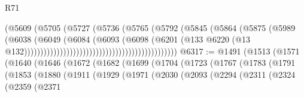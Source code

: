 \begin{lexlean}{R71}
\begin{coremodule}
                                                              (@5609
                                                                (@5705
                                                                  (@5727
                                                                    (@5736
                                                                      (@5765
                                                                        (@5792
                                                                          (@5845
                                                                            (@5864
                                                                              (@5875
                                                                                (@5989
                                                                                  (@6038
                                                                                    (@6049
                                                                                      (@6084
                                                                                        (@6093
                                                                                          (@6098
                                                                                            (@6201
                                                                                              (@133
                                                                                                @6220
                                                                                                (@13
                                                                                                  @132)))))))))))))))))))))))))))))))))))))))))))))))
@6317 := @1491
    (@1513
      (@1571
        (@1640
          (@1646
            (@1672
              (@1682
                (@1699
                  (@1704
                    (@1723
                      (@1767
                        (@1783
                          (@1791
                            (@1853
                              (@1880
                                (@1911
                                  (@1929
                                    (@1971
                                      (@2030
                                        (@2093
                                          (@2294
                                            (@2311
                                              (@2324
                                                (@2359
                                                  (@2371

\end{coremodule}
\end{lexlean}
